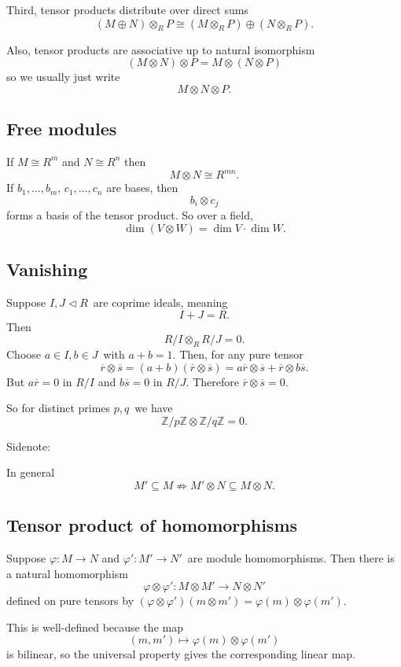 \documentclass[11pt]{article}
\begin{document}
Third, tensor products distribute over direct sums 
\[
    (M \oplus N) \otimes_R P 
    \cong (M \otimes_R P) \oplus (N \otimes_R P). 
\]

Also, tensor products are associative up to natural 
isomorphism 
\[
    (M \otimes N) \otimes P = 
    M \otimes (N \otimes P)
\]
so we usually just write 
\[
    M \otimes N \otimes P. 
\]

\subsection{Free modules}
If $M \cong R^m$ and $N \cong R^n$ 
then 
\[
    M \otimes N \cong R^{mn}.
\]
If $b_1,\ldots,b_m$, $c_1,\ldots,c_n$ are bases, then 
\[
    b_i \otimes c_j
\]
forms a basis of the tensor product. 
So over a field, 
\[
    \dim(V \otimes W) = \dim V \cdot \dim W. 
\]

\subsection{Vanishing}
Suppose $I,J \triangleleft R$ are coprime ideals, meaning 
\[
    I + J = R. 
\]
Then 
\[
    R/I \otimes_R R/J = 0. 
\]
Choose $a \in I, b \in J$ with $a+b = 1$. 
Then, for any pure tensor 
\[
    \overline{r}\otimes \overline s 
    = (a+b)(\overline r \otimes \overline s) 
    = a \overline r \otimes \overline s + 
    \overline r \otimes b \overline s. 
\]
But $a \overline r = 0$ in $R/I$ and 
$b\overline s = 0$ in $R/J$.
Therefore $\overline r \otimes \overline s = 0$. 

So for distinct primes $p,q$ we have 
\[
    \mathbb Z/p\mathbb Z \otimes \mathbb Z/q\mathbb Z =0. 
\]

Sidenote: 

In general
\[
    M' \subseteq M \not\Rightarrow 
    M' \otimes N \subseteq M \otimes N. 
\]

\subsection{Tensor product of homomorphisms}
Suppose $\varphi: M \to N$ 
and $\varphi' : M' \to N'$ are module homomorphisms. 
Then there is a natural homomorphism 
\[
    \varphi \otimes \varphi' : M \otimes M' \to 
    N \otimes N' 
\]
defined on pure tensors by $(\varphi \otimes \varphi')(m \otimes m') 
= \varphi(m) \otimes \varphi(m')$. 

This is well-defined because the map 
\[
    (m,m') \mapsto \varphi(m) \otimes \varphi(m')
\]
is bilinear, so the universal property gives the 
corresponding linear map. 
\end{document}
